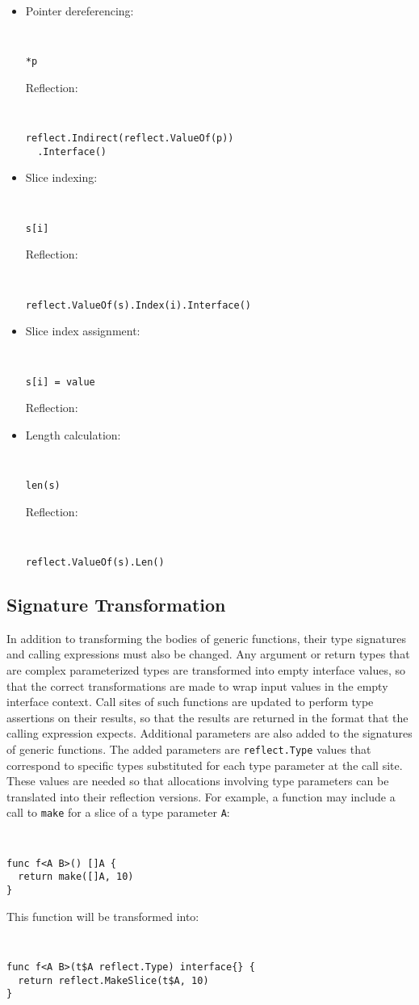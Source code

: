 \documentclass[letterpaper,twocolumn,11pt]{article}
\begin{document}
\begin{itemize}
\item
Pointer dereferencing:
{ \tt \small
\begin{verbatim}
*p
\end{verbatim}
}
Reflection:
{ \tt \small
\begin{verbatim}
reflect.Indirect(reflect.ValueOf(p))
  .Interface()
\end{verbatim}
}

\item
Slice indexing:
{ \tt \small
\begin{verbatim}
s[i]
\end{verbatim}
}
Reflection:
{ \tt \small
\begin{verbatim}
reflect.ValueOf(s).Index(i).Interface()
\end{verbatim}
}

\item
Slice index assignment:
{ \tt \small
\begin{verbatim}
s[i] = value
\end{verbatim}
}
Reflection:


\item
Length calculation:
{ \tt \small
\begin{verbatim}
len(s)
\end{verbatim}
}
Reflection:
{ \tt \small
\begin{verbatim}
reflect.ValueOf(s).Len()
\end{verbatim}
}

\end{itemize}


\subsection{Signature Transformation} \label{signature_transformation}

In addition to transforming the bodies of generic functions, their type signatures and calling expressions must also be changed. Any argument or return types that are complex parameterized types are transformed into empty interface values, so that the correct transformations are made to wrap input values in the empty interface context. Call sites of such functions are updated to perform type assertions on their results, so that the results are returned in the format that the calling expression expects. Additional parameters are also added to the signatures of generic functions. The added parameters are \texttt{reflect.Type} values that correspond to specific types substituted for each type parameter at the call site. These values are needed so that allocations involving type parameters can be translated into their reflection versions. For example, a function may include a call to \texttt{make} for a slice of a type parameter \texttt{A}:
{ \tt \small
\begin{verbatim}
func f<A B>() []A {
  return make([]A, 10)
}
\end{verbatim} 
}
This function will be transformed into:
{ \tt \small
\begin{verbatim}
func f<A B>(t$A reflect.Type) interface{} {
  return reflect.MakeSlice(t$A, 10)
}
\end{verbatim} 
}
\end{document}
